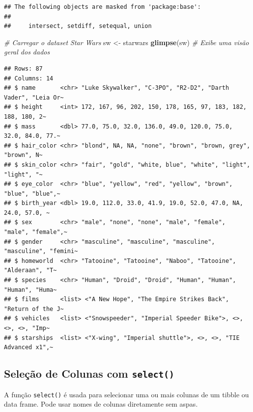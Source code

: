\documentclass[
]{book}
\newenvironment{Shaded}{\begin{snugshade}}{\end{snugshade}}
\newcommand{\CommentTok}[1]{\textcolor[rgb]{0.56,0.35,0.01}{\textit{#1}}}
\newcommand{\FunctionTok}[1]{\textcolor[rgb]{0.13,0.29,0.53}{\textbf{#1}}}
\newcommand{\NormalTok}[1]{#1}
\newcommand{\OtherTok}[1]{\textcolor[rgb]{0.56,0.35,0.01}{#1}}
\begin{document}
\begin{verbatim}
## The following objects are masked from 'package:base':
## 
##     intersect, setdiff, setequal, union
\end{verbatim}

\begin{Shaded}
\begin{Highlighting}[]
\CommentTok{\# Carregar o dataset Star Wars}
\NormalTok{sw }\OtherTok{\textless{}{-}}\NormalTok{ starwars}
\FunctionTok{glimpse}\NormalTok{(sw) }\CommentTok{\# Exibe uma visão geral dos dados}
\end{Highlighting}
\end{Shaded}

\begin{verbatim}
## Rows: 87
## Columns: 14
## $ name       <chr> "Luke Skywalker", "C-3PO", "R2-D2", "Darth Vader", "Leia Or~
## $ height     <int> 172, 167, 96, 202, 150, 178, 165, 97, 183, 182, 188, 180, 2~
## $ mass       <dbl> 77.0, 75.0, 32.0, 136.0, 49.0, 120.0, 75.0, 32.0, 84.0, 77.~
## $ hair_color <chr> "blond", NA, NA, "none", "brown", "brown, grey", "brown", N~
## $ skin_color <chr> "fair", "gold", "white, blue", "white", "light", "light", "~
## $ eye_color  <chr> "blue", "yellow", "red", "yellow", "brown", "blue", "blue",~
## $ birth_year <dbl> 19.0, 112.0, 33.0, 41.9, 19.0, 52.0, 47.0, NA, 24.0, 57.0, ~
## $ sex        <chr> "male", "none", "none", "male", "female", "male", "female",~
## $ gender     <chr> "masculine", "masculine", "masculine", "masculine", "femini~
## $ homeworld  <chr> "Tatooine", "Tatooine", "Naboo", "Tatooine", "Alderaan", "T~
## $ species    <chr> "Human", "Droid", "Droid", "Human", "Human", "Human", "Huma~
## $ films      <list> <"A New Hope", "The Empire Strikes Back", "Return of the J~
## $ vehicles   <list> <"Snowspeeder", "Imperial Speeder Bike">, <>, <>, <>, "Imp~
## $ starships  <list> <"X-wing", "Imperial shuttle">, <>, <>, "TIE Advanced x1",~
\end{verbatim}

\subsection{\texorpdfstring{Seleção de Colunas com \texttt{select()}}{Seleção de Colunas com select()}}\label{seleuxe7uxe3o-de-colunas-com-select}

A função \texttt{select()} é usada para selecionar uma ou mais colunas de um
tibble ou data frame. Pode usar nomes de colunas diretamente sem aspas.
\end{document}

